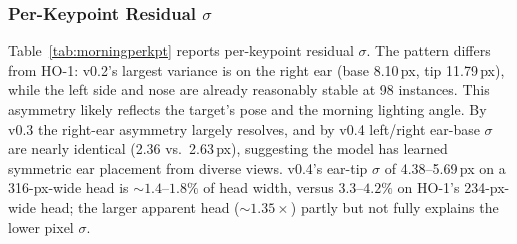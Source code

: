 \documentclass[11pt]{article}
\begin{document}
\begin{table}[t]
  \centering
  \caption{HO-2 held-out results. Stock-YOLO detection is the COCO-sheep-class
  rate (Section~\ref{sec:stock}); the any-class rate (100\%) is not reported as a
  detection figure because it does not reflect sheep localization.}
  \label{tab:morningheadline}
\end{table}

\subsubsection{Per-Keypoint Residual $\sigma$}
Table~\ref{tab:morningperkpt} reports per-keypoint residual $\sigma$. The pattern
differs from HO-1: v0.2's largest variance is on the right ear (base
8.10\,px, tip 11.79\,px), while the left side and nose are already reasonably
stable at 98 instances. This asymmetry likely reflects the target's pose and the
morning lighting angle. By v0.3 the right-ear asymmetry largely resolves, and by
v0.4 left/right ear-base $\sigma$ are nearly identical (2.36 vs.\ 2.63\,px),
suggesting the model has learned symmetric ear placement from diverse views.
v0.4's ear-tip $\sigma$ of 4.38--5.69\,px on a 316-px-wide head is
${\sim}1.4$--$1.8\%$ of head width, versus $3.3$--$4.2\%$ on HO-1's
234-px-wide head; the larger apparent head (${\sim}1.35\times$) partly but not
fully explains the lower pixel $\sigma$.
\end{document}

